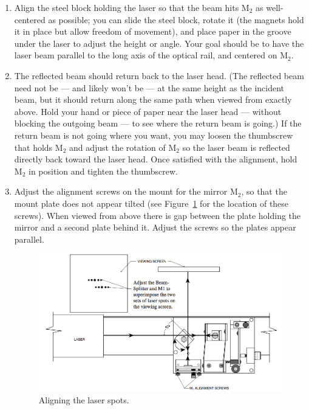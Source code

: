 \begin{enumerate}
	\item Align the steel block holding the laser so that the beam hits M$_2$ as well-centered as
	possible; you can slide the steel block, rotate it (the magnets hold it in place but allow freedom of movement), and place paper in the groove under the laser to adjust the height or angle.
	Your goal should be to have the laser beam parallel to the long axis of the optical rail, and centered on M$_2$.
	
	\item The reflected beam should return back to the laser head. (The reflected beam need not be --- and likely won’t be --- at the
	same height as the incident beam, but it should return along the same path when viewed from exactly above. Hold
	your hand or piece of paper near the laser head --- without blocking the outgoing beam --- to see where the return beam
	is going.) If the return beam is not going where you want, you may loosen the thumbscrew that holds M$_2$ and adjust
	the rotation of M$_2$ so the laser beam is reflected directly back toward the laser head. Once satisfied with the alignment,
	hold M$_2$ in position and tighten the thumbscrew.
	
	\item Adjust the alignment screws on the mount for the mirror M$_2$, so that the mount plate does not appear tilted (see Figure~\ref{mi:fig:aligning-spots} for the location of these screws). When viewed from above there is gap between the plate holding the mirror and a
	second plate behind it. Adjust the screws so the plates appear parallel.
	
	\begin{figure}
		\centering
		\includegraphics[width=\textwidth]{michelson-interferometer/aligning-laser-spots.png}
		\caption{Aligning the laser spots.}\label{mi:fig:aligning-spots}
	\end{figure}


\end{enumerate}
